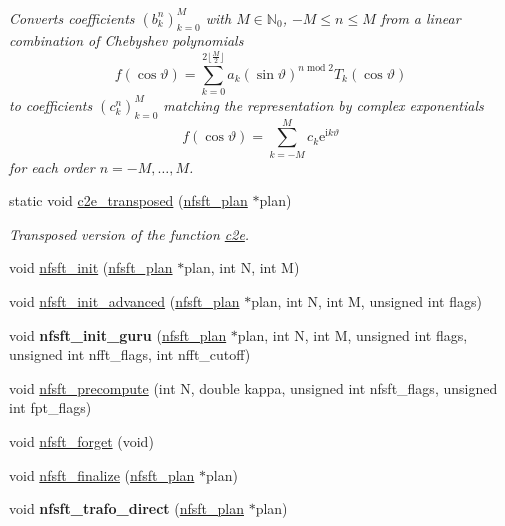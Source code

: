 \begin{DoxyCompactItemize}
\begin{DoxyCompactList}\small\item\em Converts coefficients $\left(b_k^n\right)_{k=0}^M$ with $M \in \mathbb{N}_0$, $-M \le n \le M$ from a linear combination of Chebyshev polynomials \[ f(\cos\vartheta) = \sum_{k=0}^{2\lfloor\frac{M}{2}\rfloor} a_k (\sin\vartheta)^{n\;\mathrm{mod}\;2} T_k(\cos\vartheta) \] to coefficients $\left(c_k^n\right)_{k=0}^M$ matching the representation by complex exponentials \[ f(\cos\vartheta) = \sum_{k=-M}^{M} c_k \mathrm{e}^{\mathrm{i}k\vartheta} \] for each order $n=-M,\ldots,M$. \end{DoxyCompactList}\item 
static void \hyperlink{group__nfsft_ga0e033457136bc0ecb18bb57d3ee5aa37}{c2e\-\_\-transposed} (\hyperlink{structnfsft__plan}{nfsft\-\_\-plan} $\ast$plan)
\begin{DoxyCompactList}\small\item\em Transposed version of the function \hyperlink{group__nfsft_ga47209b28b6561fca7349ed8afa5f9656}{c2e}. \end{DoxyCompactList}\item 
void \hyperlink{group__nfsft_ga65cda3f4a3edc5eb39c697cf34b1f0b9}{nfsft\-\_\-init} (\hyperlink{structnfsft__plan}{nfsft\-\_\-plan} $\ast$plan, int N, int M)
\item 
void \hyperlink{group__nfsft_ga2812aa5beba0eb7efd3072bf323a0155}{nfsft\-\_\-init\-\_\-advanced} (\hyperlink{structnfsft__plan}{nfsft\-\_\-plan} $\ast$plan, int N, int M, unsigned int flags)
\item 
\hypertarget{group__nfsft_gafff6158abcefa9a75bcfa41af5a79089}{void {\bfseries nfsft\-\_\-init\-\_\-guru} (\hyperlink{structnfsft__plan}{nfsft\-\_\-plan} $\ast$plan, int N, int M, unsigned int flags, unsigned int nfft\-\_\-flags, int nfft\-\_\-cutoff)}\label{group__nfsft_gafff6158abcefa9a75bcfa41af5a79089}

\item 
void \hyperlink{group__nfsft_gabe87aeea1f7cfef9ae8febb16d702f3b}{nfsft\-\_\-precompute} (int N, double kappa, unsigned int nfsft\-\_\-flags, unsigned int fpt\-\_\-flags)
\item 
void \hyperlink{group__nfsft_ga3b69bca6c76a63877534f5a9781bf285}{nfsft\-\_\-forget} (void)
\item 
void \hyperlink{group__nfsft_gaa63e193a27d84059742ff25ff81e2ed1}{nfsft\-\_\-finalize} (\hyperlink{structnfsft__plan}{nfsft\-\_\-plan} $\ast$plan)
\item 
\hypertarget{group__nfsft_ga7628057164579a29cc77487cda6772e5}{void {\bfseries nfsft\-\_\-trafo\-\_\-direct} (\hyperlink{structnfsft__plan}{nfsft\-\_\-plan} $\ast$plan)}\label{group__nfsft_ga7628057164579a29cc77487cda6772e5}


\end{DoxyCompactItemize}
